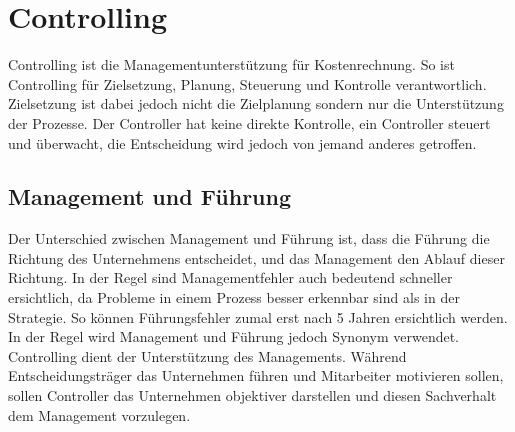 \documentclass{article}
\begin{document}
	\section{Controlling}
	Controlling ist die Managementunterstützung für Kostenrechnung. So ist Controlling für Zielsetzung, Planung, Steuerung und Kontrolle verantwortlich. Zielsetzung ist dabei jedoch nicht die Zielplanung sondern nur die Unterstützung der Prozesse. Der Controller hat keine direkte Kontrolle, ein Controller steuert und überwacht, die Entscheidung wird jedoch von jemand anderes getroffen.
	\subsection{Management und Führung}
	Der Unterschied zwischen Management und Führung ist, dass die Führung die Richtung des Unternehmens entscheidet, und das Management den Ablauf dieser Richtung. In der Regel sind Managementfehler auch bedeutend schneller ersichtlich, da Probleme in einem Prozess besser erkennbar sind als in der Strategie. So können Führungsfehler zumal erst nach 5 Jahren ersichtlich werden. In der Regel wird Management und Führung jedoch Synonym verwendet. \\
	Controlling dient der Unterstützung des Managements. Während Entscheidungsträger das Unternehmen führen und Mitarbeiter motivieren sollen, sollen Controller das Unternehmen objektiver darstellen und diesen Sachverhalt dem Management vorzulegen.

	























  
\end{document}

